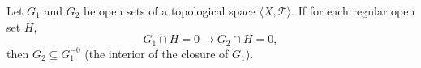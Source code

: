 Let $G_1$ and $G_2$ be open sets of a topological space $\langle X, \mathcal{T} \rangle$. If for each regular open set $H$,
$$G_1 \cap H = 0 \rightarrow G_2 \cap H = 0,$$
then $G_2 \subseteq G_1^{-0}$ (the interior of the closure of $G_1$).
